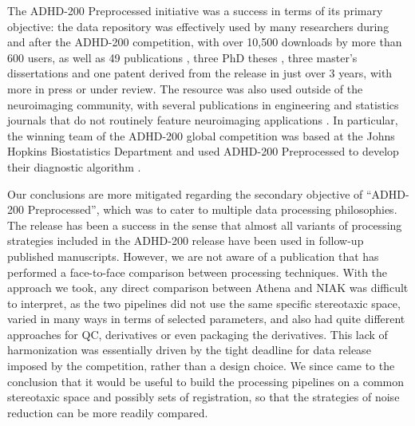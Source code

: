 \documentclass[preprint,12pt,3p]{elsarticle}
\begin{document}
The ADHD-200 Preprocessed initiative was a success in terms of its primary objective: the data repository was effectively used by many researchers during and after the ADHD-200 competition, with over 10,500 downloads by more than 600 users, as well as 49 publications \cite{Rangarajan2014, Liang2012, Tabas2014, Rangarajan2015, Mahanand2013, Lifshitz2012, Fujita2013, Ji2011, Li2015, Li2013, Liu2012, DosSantosSiqueira2014, Olivetti2014, Han2015, Wang2013a, Subramanian2013, Dey2014, Bellec2012, Bohland2012, Chang2012, Cheng2012, Colby2012, Dai2012, Dey2012, Eloyan2012, Olivetti2012, Sato2012a, Carmona2015, Carmona2015a, Hou2015, Deshpande2015, She2014, Lavoie-Courchesne2012b, Chen2015, Nunez-Garcia2015, Solmaz2012, Anderson2014, KadkhodaeianBakhtiari2012, Sato2013, Kyeong2015, Sato2012, Takahashi2012, He2013, Kong2013, Yao2013, Yang2015, Ahn2015, Fujita2014, Reiss2014}, three PhD theses \cite{Colby2012a, Dey2013, Zhang2012}, three master's dissertations \cite{VanGalenLast2011, Vidal2014, Wang2013} and one patent \cite{Dey2013} derived from the release in just over 3 years, with more in press or under review. The resource was also used outside of the neuroimaging community, with several publications in engineering and statistics journals that do not routinely feature neuroimaging applications \citep[e.g.][]{Liang2012, Rangarajan2015, Rangarajan2014, Mahanand2013, Ji2011, Li2015, Li2013, Liu2012, Subramanian2013, Hou2015, Deshpande2015, She2014, Chen2015, He2013, Kong2013, Yang2015, Ahn2015}. In particular, the winning team of the ADHD-200 global competition was based at the Johns Hopkins Biostatistics Department and used ADHD-200 Preprocessed to develop their diagnostic algorithm \cite{Eloyan2012}.
\par 
Our conclusions are more mitigated regarding the secondary objective of ``ADHD-200 Preprocessed'', which was to cater to multiple data processing philosophies. The release has been a success in the sense that almost all variants of processing strategies included in the ADHD-200 release have been used in follow-up published manuscripts. However, we are not aware of a publication that has performed a face-to-face comparison between processing techniques. With the approach we took, any direct comparison between Athena and NIAK was difficult to interpret, as the two pipelines did not use the same specific stereotaxic space, varied in many ways in terms of selected parameters, and also had quite different approaches for QC, derivatives or even packaging the derivatives. This lack of harmonization was essentially driven by the tight deadline for data release imposed by the competition, rather than a design choice. We since came to the conclusion that it would be useful to build the processing pipelines on a common stereotaxic space and possibly sets of registration, so that the strategies of noise reduction can be more readily compared. 
\end{document}
